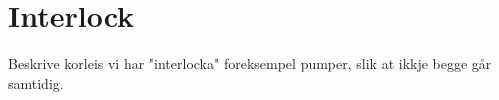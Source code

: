 \section{Interlock}
\thispagestyle{fancy}

Beskrive korleis vi har "interlocka" foreksempel pumper, slik at ikkje begge går samtidig.